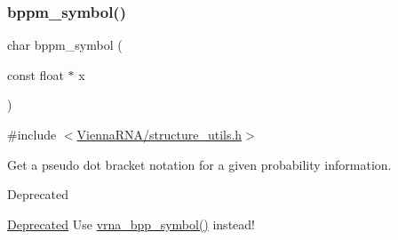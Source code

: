 \subsubsection{\texorpdfstring{bppm\+\_\+symbol()}{bppm\_symbol()}}
{\footnotesize\ttfamily char bppm\+\_\+symbol (\begin{DoxyParamCaption}\item[{const float $\ast$}]{x }\end{DoxyParamCaption})}



{\ttfamily \#include $<$\hyperlink{structure__utils_8h}{Vienna\+R\+N\+A/structure\+\_\+utils.\+h}$>$}



Get a pseudo dot bracket notation for a given probability information. 

\begin{DoxyRefDesc}{Deprecated}
\item[\hyperlink{deprecated__deprecated000150}{Deprecated}]Use \hyperlink{group__struct__utils_ga025bff1b27fa46534c8fae6980f64bb5}{vrna\+\_\+bpp\+\_\+symbol()} instead! \end{DoxyRefDesc}

